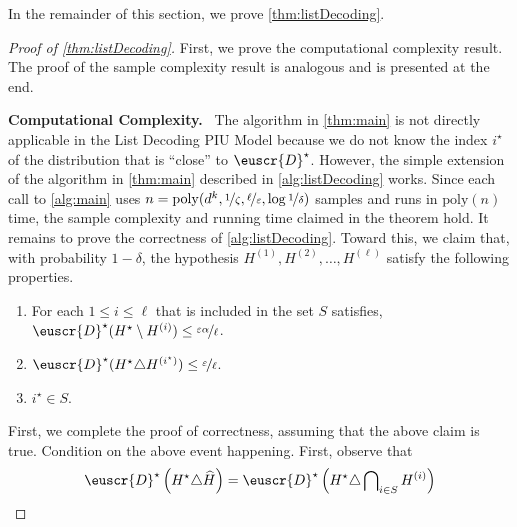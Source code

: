 \documentclass[11pt]{article}
\theoremstyle{plain}
\theoremstyle{definition}
\theoremstyle{remark}
\newcommand{\sinparen}[1]{(#1)}
\newcommand{\inparen}[1]{\left(#1\right)}
\newcommand{\nfrac}[2]{\nicefrac{#1}{#2}}
\newcommand{\poly}{\mathrm{poly}}
\newcommand{\eps}{\varepsilon}
\newcommand{\wh}[1]{\widehat{#1}}
\newcommand{\customcal}[1]{\euscr{#1}}
\newcommand{\cD}{\customcal{D}}
\renewcommand{\paragraph}[1]{\medskip \noindent\textbf{#1}~}
\newcommand{\optset}{{H^\star}}
\newcommand{\cDtrue}{\cD^\star}
\begin{document}
            In the remainder of this section, we prove \cref{thm:listDecoding}.
            \begin{proof}[Proof of \cref{thm:listDecoding}]
                First, we prove the computational complexity result. 
                The proof of the sample complexity result is analogous and is presented at the end.

                \paragraph{Computational Complexity.}
                    The algorithm in \cref{thm:main} is not directly applicable in the List Decoding PIU Model because we do not know the index $i^\star$ of the distribution that is ``close'' to $\cDtrue$.
                    However, the simple extension of the algorithm in \cref{thm:main} described in \cref{alg:listDecoding} works.
                    Since each call to \cref{alg:main} uses $n=\poly(d^k, \nfrac{1}{\zeta}, \nfrac{\ell}{\eps}, \log \nfrac{1}{\delta})$  samples and runs in $\poly(n)$ time, the sample complexity and running time claimed in the theorem hold.
                    It remains to prove the correctness of \cref{alg:listDecoding}.
                    Toward this, we claim that, with probability $1-\delta$, the hypothesis $H^{(1)},H^{(2)},\dots,H^{(\ell)}$ satisfy the following properties.
                    \begin{enumerate}[label=(P\arabic*)]
                        \item For each $1\leq i\leq \ell$ that is included in the set $S$ satisfies, $\cDtrue\sinparen{\optset\setminus H^{(i)}}\leq \nfrac{\eps\alpha}{\ell}$.
                        \label{property:listDecoding:proof:1}
                        \item $\cDtrue\sinparen{\optset\triangle H^{(i^\star)}}\leq \nfrac{\eps}{\ell}$.
                        \label{property:listDecoding:proof:2}
                        \item $i^\star\in S$.
                        \label{property:listDecoding:proof:3}
                    \end{enumerate}
                    First, we complete the proof of correctness, assuming that the above claim is true.
                    Condition on the above event happening.
                    First, observe that 
                    \[
                        \cDtrue\inparen{\optset \triangle \wh{H}}
                        = \cDtrue\inparen{\optset \triangle \bigcap\nolimits_{i\in S} H^{(i)}}
\]
\end{proof}
\end{document}
